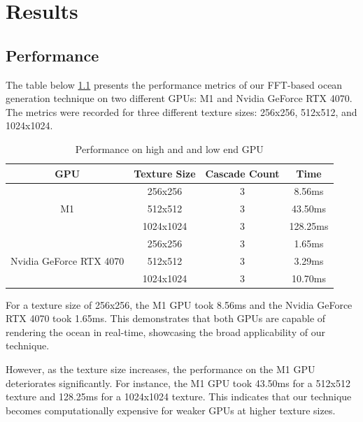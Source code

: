 \justifying
\chapter{Results}
\label{chapter3}

\section{Performance}

The table below \ref{tab:fft_performance} presents the performance metrics of our FFT-based ocean generation technique on two different GPUs: M1 and Nvidia GeForce RTX 4070. The metrics were recorded for three different texture sizes: 256x256, 512x512, and 1024x1024.

\begin{table}[h]
    \centering
    \begin{tabular}{cccc}
        \toprule
        \textbf{GPU} & \textbf{Texture Size} & \textbf{Cascade Count} & \textbf{Time} \\
        \midrule
        \multirow{3}{*}{M1} & 256x256 & 3 & 8.56ms \\
                             & 512x512 & 3 & 43.50ms \\
                             & 1024x1024 & 3 & 128.25ms \\
        \midrule
        \multirow{3}{*}{Nvidia GeForce RTX 4070} & 256x256 & 3 & 1.65ms \\
                                                  & 512x512 & 3 & 3.29ms \\
                                                  & 1024x1024 & 3 & 10.70ms \\
        \bottomrule
    \end{tabular}
    \caption{Performance on high and and low end GPU}
    \label{tab:fft_performance}
\end{table}

For a texture size of 256x256, the M1 GPU took 8.56ms and the Nvidia GeForce RTX 4070 took 1.65ms. This demonstrates that both GPUs are capable of rendering the ocean in real-time, showcasing the broad applicability of our technique.

However, as the texture size increases, the performance on the M1 GPU deteriorates significantly. For instance, the M1 GPU took 43.50ms for a 512x512 texture and 128.25ms for a 1024x1024 texture. This indicates that our technique becomes computationally expensive for weaker GPUs at higher texture sizes.

